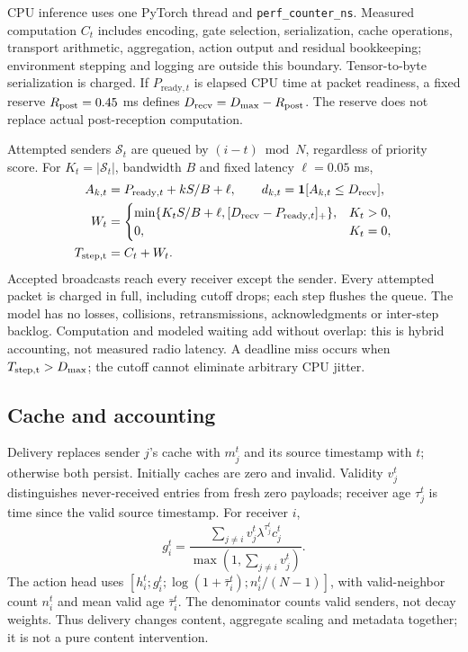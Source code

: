 \documentclass[10pt]{article}
\newcommand{\ind}{\mathbf{1}}
\begin{document}
CPU inference uses one PyTorch thread and \texttt{perf\_counter\_ns}. Measured computation $C_t$ includes encoding, gate selection, serialization, cache operations, transport arithmetic, aggregation, action output and residual bookkeeping; environment stepping and logging are outside this boundary. Tensor-to-byte serialization is charged. If $P_{\mathrm{ready},t}$ is elapsed CPU time at packet readiness, a fixed reserve $R_{\rm post}=0.45$ ms defines $D_{\rm recv}=D_{\max}-R_{\rm post}$. The reserve does not replace actual post-reception computation.

Attempted senders $\mathcal S_t$ are queued by $(i-t)\bmod N$, regardless of priority score. For $K_t=|\mathcal S_t|$, bandwidth $B$ and fixed latency $\ell=0.05$ ms,
\begin{align}
 A_{k,t}&=P_{\mathrm{ready},t}+kS/B+\ell,\qquad d_{k,t}=\ind[A_{k,t}\le D_{\rm recv}],\\
 W_t&=\begin{cases}\min\{K_tS/B+\ell,[D_{\rm recv}-P_{\mathrm{ready},t}]_+\},&K_t>0,\\0,&K_t=0,\end{cases}\\
 T_{\rm step,t}&=C_t+W_t.\label{eq:step}
\end{align}
Accepted broadcasts reach every receiver except the sender. Every attempted packet is charged in full, including cutoff drops; each step flushes the queue. The model has no losses, collisions, retransmissions, acknowledgments or inter-step backlog. Computation and modeled waiting add without overlap: this is hybrid accounting, not measured radio latency. A deadline miss occurs when $T_{\rm step,t}>D_{\max}$; the cutoff cannot eliminate arbitrary CPU jitter.

\subsection{Cache and accounting}
Delivery replaces sender $j$'s cache with $m_j^t$ and its source timestamp with $t$; otherwise both persist. Initially caches are zero and invalid. Validity $v_j^t$ distinguishes never-received entries from fresh zero payloads; receiver age $\tau_j^t$ is time since the valid source timestamp. For receiver $i$,
\begin{equation}
 g_i^t=\frac{\sum_{j\ne i}v_j^t\lambda^{\tau_j^t}c_j^t}{\max(1,\sum_{j\ne i}v_j^t)}.
\end{equation}
The action head uses $[h_i^t;g_i^t;\log(1+\bar\tau_i^t);n_i^t/(N-1)]$, with valid-neighbor count $n_i^t$ and mean valid age $\bar\tau_i^t$. The denominator counts valid senders, not decay weights. Thus delivery changes content, aggregate scaling and metadata together; it is not a pure content intervention.
\end{document}
